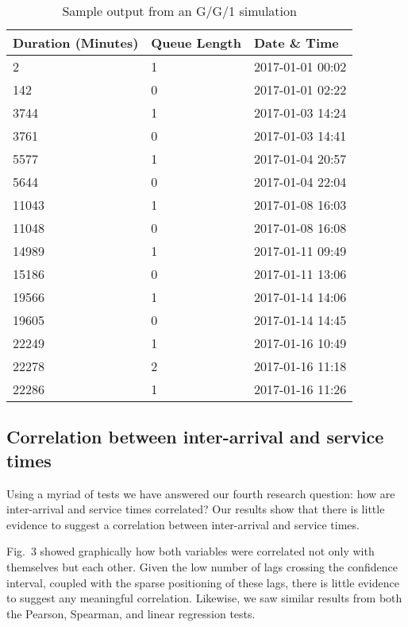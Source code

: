 \documentclass[5p]{elsarticle}
\begin{document}
\begin {table}
\caption {Sample output from an G/G/1 simulation} 
\begin{center}
\begin{tabular}{p{1.8cm} |  p{1.25cm} | p{3.2cm}} \hline \bf{Duration (Minutes)} & \bf{Queue Length}  & \bf{Date \& Time}
\\ \hline 2  & 1 & 2017-01-01 00:02
\\ 142 & 0 & 2017-01-01 02:22
\\ 3744 & 1 & 2017-01-03 14:24 
\\ 3761 & 0 & 2017-01-03 14:41
\\ 5577 & 1 & 2017-01-04 20:57
\\ 5644 & 0 & 2017-01-04 22:04
\\ 11043 & 1 & 2017-01-08 16:03
\\ 11048 & 0 & 2017-01-08 16:08
\\ 14989 & 1 & 2017-01-11 09:49 
\\ 15186 & 0 & 2017-01-11 13:06 
\\ 19566 & 1 & 2017-01-14 14:06
\\ 19605 & 0 & 2017-01-14 14:45
\\ 22249 & 1 &  2017-01-16 10:49
\\ 22278 & 2 & 2017-01-16 11:18
\\ 22286 & 1 & 2017-01-16 11:26
\\ \hline
\end{tabular}
\end{center}
\end{table}


\subsection{Correlation between inter-arrival and service times}

Using a myriad of tests we have answered our fourth research question: how are inter-arrival and service times correlated? Our results show that there is little evidence to suggest a correlation between inter-arrival and service times.

Fig.~3 showed graphically how both variables were correlated not only with themselves but each other. Given the low number of lags crossing the confidence interval, coupled with the sparse positioning of these lags, there is little evidence to suggest any meaningful correlation. Likewise, we saw similar results from both the Pearson, Spearman, and linear regression tests. 
\end{document}
